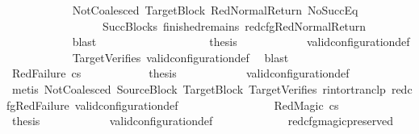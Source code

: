 \begin{isabellebody}
\ \ \ \ \ \ \ \ \ \ \isamarkupfalse%
\ NotCoalesced\ TargetBlock\ RedNormalReturn\ NoSuccEq\isanewline
\ \ \ \ \ \ \ \ \ \ \ \ \ \ \ \ {\isachardoublequoteopen}{}{\isachardoublequoteclose}{\isacharparenleft}{\kern0pt}{}{\isacharparenright}{\kern0pt}\ SuccBlocks\ finished{\isacharunderscore}{\kern0pt}remains\ red{\isacharunderscore}{\kern0pt}cfg{\isachardot}{\kern0pt}RedNormalReturn\ \isanewline
\ \ \ \ \ \ \ \ \ \ \isamarkupfalse%
\ blast\ \ \ \ \ \ \ \ \isanewline
\ \ \ \ \ \ \ \ \isamarkupfalse%
\ \isamarkupfalse%
\ {\isacharquery}{\kern0pt}thesis\isanewline
\ \ \ \ \ \ \ \ \ \ \isamarkupfalse%
\ valid{\isacharunderscore}{\kern0pt}configuration{\isacharunderscore}{\kern0pt}def\isanewline
\ \ \ \ \ \ \ \ \ \ \isamarkupfalse%
\ TargetVerifies\ valid{\isacharunderscore}{\kern0pt}configuration{\isacharunderscore}{\kern0pt}def\ \isamarkupfalse%
\ blast\isanewline
\ \ \ \ \ \ \isamarkupfalse%
\isanewline
\ \ \ \ \ \ \ \ \isamarkupfalse%
\ {\isacharparenleft}{\kern0pt}RedFailure\ cs{\isacharparenright}{\kern0pt}\isanewline
\ \ \ \ \ \ \ \ \isamarkupfalse%
\ \isamarkupfalse%
\ {\isacharquery}{\kern0pt}thesis\isanewline
\ \ \ \ \ \ \ \ \ \ \isamarkupfalse%
\ valid{\isacharunderscore}{\kern0pt}configuration{\isacharunderscore}{\kern0pt}def\isanewline
\ \ \ \ \ \ \ \ \ \ \isamarkupfalse%
\ {\isacharparenleft}{\kern0pt}metis\ NotCoalesced\ SourceBlock\ TargetBlock\ TargetVerifies\ r{\isacharunderscore}{\kern0pt}into{\isacharunderscore}{\kern0pt}rtranclp\ red{\isacharunderscore}{\kern0pt}cfg{\isachardot}{\kern0pt}RedFailure\ valid{\isacharunderscore}{\kern0pt}configuration{\isacharunderscore}{\kern0pt}def{\isacharparenright}{\kern0pt}\isanewline
\ \ \ \ \ \ \isamarkupfalse%
\isanewline
\ \ \ \ \ \ \ \ \isamarkupfalse%
\ {\isacharparenleft}{\kern0pt}RedMagic\ cs{\isacharparenright}{\kern0pt}\isanewline
\ \ \ \ \ \ \ \ \isamarkupfalse%
\ \isamarkupfalse%
\ {\isacharquery}{\kern0pt}thesis\isanewline
\ \ \ \ \ \ \ \ \ \ \isamarkupfalse%
\ valid{\isacharunderscore}{\kern0pt}configuration{\isacharunderscore}{\kern0pt}def\isanewline
\ \ \ \ \ \ \ \ \ \ \isamarkupfalse%
\ {\isachardoublequoteopen}{}{\isachardoublequoteclose}{\isacharparenleft}{\kern0pt}{}{\isacharparenright}{\kern0pt}\ red{\isacharunderscore}{\kern0pt}cfg{\isacharunderscore}{\kern0pt}magic{\isacharunderscore}{\kern0pt}preserved\ \isamarkupfalse%

\end{isabellebody}

